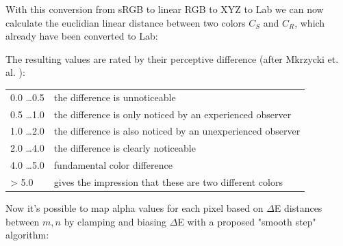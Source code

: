 
With this conversion from sRGB to linear RGB to XYZ to Lab we can now calculate 
the euclidian linear distance between two colors $C_S$ and $C_R$, which already 
have been converted to Lab:


The resulting values are rated by their perceptive difference (after Mkrzycki 
et. al. \cite{mokrzycki:2012}):

\begin{tabular}[htb]{l | l}
	0.0 \dots 0.5 & the difference is unnoticeable \\
	0.5 \dots 1.0 & the difference is only noticed by an experienced observer \\
	1.0 \dots 2.0 & the difference is also noticed by an unexperienced observer 
	\\
	2.0 \dots 4.0 & the difference is clearly noticeable \\
	4.0 \dots 5.0 & fundamental color difference  \\
	> 5.0 		  & gives the impression that these are two different 
	colors
\end{tabular}

Now it's possible to map alpha values for each pixel based on $\Delta$E 
distances between $m, n$ by clamping and biasing $\Delta$E with a proposed 
"smooth step" algorithm:



